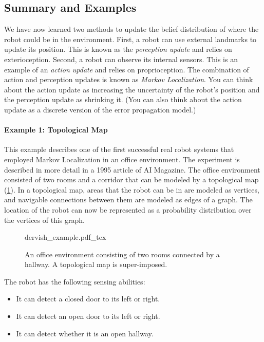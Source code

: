 \subsection{Summary and Examples}
We have now learned two methods to update the belief distribution of where the robot could be in the environment. First, a robot can use external landmarks to update its position. This is known as the \textsl{perception update} and relies on exterioception. Second, a robot can observe its internal sensors. This is an example of an \textsl{action update} and relies on proprioception. The combination of action and perception updates is known as \textsl{Markov Localization}. You can think about the action update as increasing the uncertainty of the robot's position and the perception update as shrinking it. (You can also think about the action update as a discrete version of the error propagation model.) %

\paragraph{Example 1: Topological Map}
This example describes one of the first successful real robot systems that employed Markov Localization in an office environment. The experiment is described in more detail in a 1995 article of AI Magazine\cite{nourbakhsh1995dervish}. The office environment consisted of two rooms and a corridor that can be modeled by a topological map (\cref{fig:dervish_example}). In a topological map, areas that the robot can be in are modeled as vertices, and navigable connections between them are modeled as edges of a graph. The location of the robot can now be represented as a probability distribution over the vertices of  this graph.

\begin{figure}
	\centering
    \def\svgwidth{\textwidth}
    {dervish_example.pdf_tex}
	\caption{An office environment consisting of two rooms connected by a hallway. A topological map is super-imposed.
	\label{fig:dervish_example}}
\end{figure}

The robot has the following sensing abilities:
\begin{itemize}
    \item It can detect a closed door to its left or right.
    \item It can detect an open door to its left or right.
    \item It can detect whether it is an open hallway.
\end{itemize}

